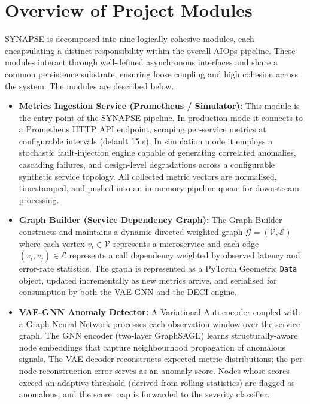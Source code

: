 \section{Overview of Project Modules}

\hspace*{0.3in} SYNAPSE is decomposed into nine logically cohesive modules, each encapsulating a distinct responsibility within the overall AIOps pipeline. These modules interact through well-defined asynchronous interfaces and share a common persistence substrate, ensuring loose coupling and high cohesion across the system. The modules are described below.

\begin{itemize}

    \item \textbf{Metrics Ingestion Service (Prometheus / Simulator):}
    This module is the entry point of the SYNAPSE pipeline. In production mode it connects to a Prometheus HTTP API endpoint, scraping per-service metrics at configurable intervals (default 15 s). In simulation mode it employs a stochastic fault-injection engine capable of generating correlated anomalies, cascading failures, and design-level degradations across a configurable synthetic service topology. All collected metric vectors are normalised, timestamped, and pushed into an in-memory pipeline queue for downstream processing.

    \item \textbf{Graph Builder (Service Dependency Graph):}
    The Graph Builder constructs and maintains a dynamic directed weighted graph $\mathcal{G} = (\mathcal{V}, \mathcal{E})$ where each vertex $v_i \in \mathcal{V}$ represents a microservice and each edge $(v_i, v_j) \in \mathcal{E}$ represents a call dependency weighted by observed latency and error-rate statistics. The graph is represented as a PyTorch Geometric \texttt{Data} object, updated incrementally as new metrics arrive, and serialised for consumption by both the VAE-GNN and the DECI engine.

    \item \textbf{VAE-GNN Anomaly Detector:}
    A Variational Autoencoder coupled with a Graph Neural Network processes each observation window over the service graph. The GNN encoder (two-layer GraphSAGE) learns structurally-aware node embeddings that capture neighbourhood propagation of anomalous signals. The VAE decoder reconstructs expected metric distributions; the per-node reconstruction error serves as an anomaly score. Nodes whose scores exceed an adaptive threshold (derived from rolling statistics) are flagged as anomalous, and the score map is forwarded to the severity classifier.


\end{itemize}
